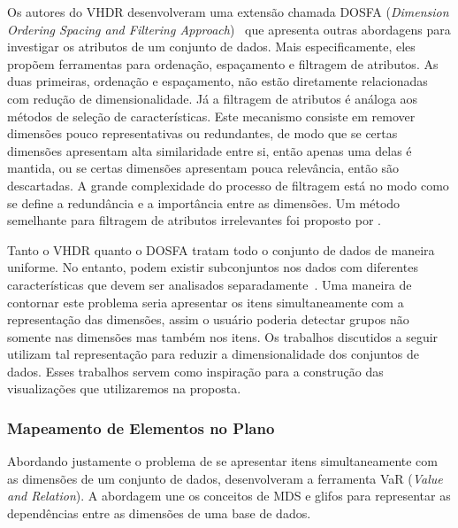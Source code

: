 Os autores do VHDR desenvolveram uma extensão chamada DOSFA
(\emph{Dimension Ordering Spacing and Filtering
Approach})~\cite{DOSFA} que apresenta outras abordagens para
investigar os atributos de um conjunto de dados. Mais
especificamente, eles propõem ferramentas para ordenação,
espaçamento e filtragem de atributos. As duas primeiras,
ordenação e espaçamento, não estão diretamente relacionadas
com redução de dimensionalidade. Já a filtragem de atributos
é análoga aos métodos de seleção de características. Este
mecanismo consiste em remover dimensões pouco
representativas ou redundantes, de modo que se certas
dimensões apresentam alta similaridade entre si, então
apenas uma delas é mantida, ou se certas dimensões
apresentam pouca relevância, então são descartadas. A grande
complexidade do processo de filtragem está no modo como se
define a redundância e a importância entre as dimensões. Um
método semelhante para filtragem de atributos irrelevantes
foi proposto por \citet{Artero2006}.

Tanto o VHDR quanto o DOSFA tratam todo o conjunto de dados
de maneira uniforme. No entanto, podem existir subconjuntos
nos dados com diferentes características que devem ser
analisados separadamente~\cite{May2011}. Uma maneira de
contornar este problema seria apresentar os itens
simultaneamente com a representação das dimensões, assim o
usuário poderia detectar grupos não somente nas dimensões
mas também nos itens. Os trabalhos discutidos a seguir
utilizam tal representação para reduzir a dimensionalidade
dos conjuntos de dados. Esses trabalhos servem como
inspiração para a construção das visualizações que
utilizaremos na proposta.  

\subsubsection{Mapeamento de Elementos no Plano}

Abordando justamente o problema de se apresentar itens
simultaneamente com as dimensões de um conjunto de dados,
\citet{Yang2004} desenvolveram a ferramenta VaR (\emph{Value and
Relation}). A abordagem une os conceitos de MDS e glifos para
representar as dependências entre as dimensões de uma base
de dados. 

